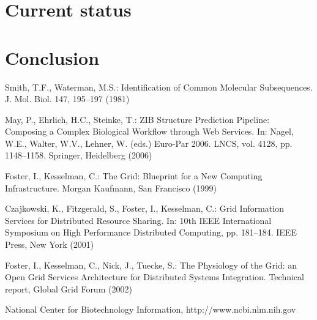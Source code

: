 \documentclass[lnbip]{svmultln}
\begin{document}
\section{Current status}
\label{sec:nowadays}

\section{Conclusion}
\label{sec:conclusion}

%
%
\begin{thebibliography}{5}

 Smith, T.F., Waterman, M.S.: Identification of Common Molecular
Subsequences. J. Mol. Biol. 147, 195--197 (1981)

 May, P., Ehrlich, H.C., Steinke, T.: ZIB Structure Prediction Pipeline:
Composing a Complex Biological Workflow through Web Services. In: Nagel,
W.E., Walter, W.V., Lehner, W. (eds.) Euro-Par 2006. LNCS, vol. 4128,
pp. 1148--1158. Springer, Heidelberg (2006)

 Foster, I., Kesselman, C.: The Grid: Blueprint for a New Computing
Infrastructure. Morgan Kaufmann, San Francisco (1999)

 Czajkowski, K., Fitzgerald, S., Foster, I., Kesselman, C.: Grid
Information Services for Distributed Resource Sharing. In: 10th IEEE
International Symposium on High Performance Distributed Computing, pp.
181--184. IEEE Press, New York (2001)

 Foster, I., Kesselman, C., Nick, J., Tuecke, S.: The Physiology of the
Grid: an Open Grid Services Architecture for Distributed Systems
Integration. Technical report, Global Grid Forum (2002)

 National Center for Biotechnology Information, http://www.ncbi.nlm.nih.gov

\end{thebibliography}
%
\end{document}
